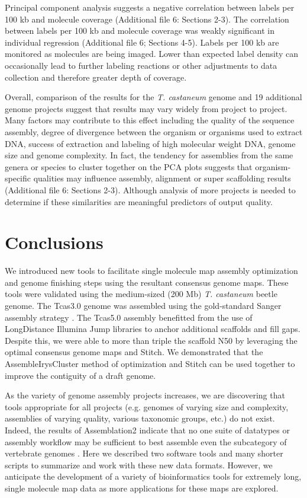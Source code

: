 \documentclass{bmcart}
\begin{document}
Principal component analysis suggests a negative correlation between
labels per 100 kb and molecule coverage (Additional file 6: Sections
2-3). The correlation between labels per 100 kb and molecule coverage
was weakly significant in individual regression (Additional file 6; Sections
4-5). Labels per 100 kb are monitored as molecules are being imaged.
Lower than expected label density can occasionally lead to further
labeling reactions or other adjustments to data collection and therefore
greater depth of coverage.

Overall, comparison of the results for the \textit{T. castaneum} genome
and 19 additional genome projects suggest that results may vary widely
from project to project. Many factors may contribute to this effect
including the quality of the sequence assembly, degree of divergence
between the organism or organisms used to extract DNA, success of
extraction and labeling of high molecular weight DNA, genome size and
genome complexity. In fact, the tendency for assemblies from the same
genera or species to cluster together on the PCA plots suggests that
organism-specific qualities may influence assembly, alignment or super
scaffolding results (Additional file 6: Sections 2-3). Although analysis of more
projects is needed to determine if these similarities are meaningful
predictors of output quality.

\section*{Conclusions}

We introduced new tools to facilitate single molecule map assembly optimization and genome finishing steps using the resultant consensus genome maps. These tools were validated using the medium-sized (200 Mb) \textit{T. castaneum} beetle genome. The Tcas3.0 genome was  assembled using the gold-standard Sanger assembly strategy \cite{Beetle2008}. The Tcas5.0 assembly benefitted from the use of LongDistance Illumina Jump libraries to anchor additional scaffolds and fill gaps. Despite this, we were able to more than triple the scaffold N50 by leveraging the optimal consensus genome maps and Stitch. We demonstrated that the AssembleIrysCluster method of optimization and Stitch can be used together to improve the contiguity of a draft genome.


As the variety of genome assembly projects increases, we are discovering that tools appropriate for all projects (e.g. genomes of varying size and complexity, assemblies of varying quality, various taxonomic groups, etc.) do not exist. Indeed, the results of Assemblation2 indicate that no one suite of datatypes or assembly workflow may be sufficient to best assemble even the subcategory of vertebrate genomes \cite{Assem22013}. Here we described two software tools and many shorter scripts to summarize and work with these new data formats. However, we anticipate the development of a variety of bioinformatics tools for extremely long, single molecule map data as more applications for these maps are explored.
\end{document}
